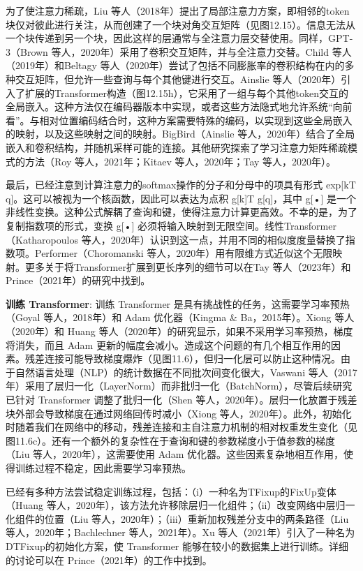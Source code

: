 \documentclass[lang=cn,newtx,10pt,scheme=chinese]{elegantbook}
\begin{document}
为了使注意力稀疏，Liu 等人（2018年）提出了局部注意力方案，即相邻的token块仅对彼此进行关注，从而创建了一个块对角交互矩阵（见图12.15）。信息无法从一个块传递到另一个块，因此这样的层通常与全注意力层交替使用。同样，GPT-3（Brown 等人，2020年）采用了卷积交互矩阵，并与全注意力交替。Child 等人（2019年）和Beltagy 等人（2020年）尝试了包括不同膨胀率的卷积结构在内的多种交互矩阵，但允许一些查询与每个其他键进行交互。Ainslie 等人（2020年）引入了扩展的Transformer构造（图12.15h），它采用了一组与每个其他token交互的全局嵌入。这种方法仅在编码器版本中实现，或者这些方法隐式地允许系统“向前看”。与相对位置编码结合时，这种方案需要特殊的编码，以实现到这些全局嵌入的映射，以及这些映射之间的映射。BigBird（Ainslie 等人，2020年）结合了全局嵌入和卷积结构，并随机采样可能的连接。其他研究探索了学习注意力矩阵稀疏模式的方法（Roy 等人，2021年；Kitaev 等人，2020年；Tay 等人，2020年）。

最后，已经注意到计算注意力的softmax操作的分子和分母中的项具有形式 exp[kT q]。这可以被视为一个核函数，因此可以表达为点积 g[k]T g[q]，其中 g[•] 是一个非线性变换。这种公式解耦了查询和键，使得注意力计算更高效。不幸的是，为了复制指数项的形式，变换 g[•] 必须将输入映射到无限空间。线性Transformer（Katharopoulos 等人，2020年）认识到这一点，并用不同的相似度度量替换了指数项。Performer（Choromanski 等人，2020年）用有限维方式近似这个无限映射。更多关于将Transformer扩展到更长序列的细节可以在Tay 等人（2023年）和Prince（2021年）的研究中找到。

\textbf{训练 Transformer}: 训练 Transformer 是具有挑战性的任务，这需要学习率预热（Goyal 等人，2018年）和 Adam 优化器（Kingma \& Ba，2015年）。Xiong 等人（2020年）和 Huang 等人（2020年）的研究显示，如果不采用学习率预热，梯度将消失，而且 Adam 更新的幅度会减小。造成这个问题的有几个相互作用的因素。残差连接可能导致梯度爆炸（见图11.6），但归一化层可以防止这种情况。由于自然语言处理（NLP）的统计数据在不同批次间变化很大，Vaswani 等人（2017年）采用了层归一化（LayerNorm）而非批归一化（BatchNorm），尽管后续研究已针对 Transformer 调整了批归一化（Shen 等人，2020年）。层归一化放置于残差块外部会导致梯度在通过网络回传时减小（Xiong 等人，2020年）。此外，初始化时随着我们在网络中的移动，残差连接和主自注意力机制的相对权重发生变化（见图11.6c）。还有一个额外的复杂性在于查询和键的参数梯度小于值参数的梯度（Liu 等人，2020年），这需要使用 Adam 优化器。这些因素复杂地相互作用，使得训练过程不稳定，因此需要学习率预热。

已经有多种方法尝试稳定训练过程，包括：（i）一种名为TFixup的FixUp变体（Huang 等人，2020年），该方法允许移除层归一化组件；（ii）改变网络中层归一化组件的位置（Liu 等人，2020年）；（iii）重新加权残差分支中的两条路径（Liu 等人，2020年；Bachlechner 等人，2021年）。Xu 等人（2021年）引入了一种名为DTFixup的初始化方案，使 Transformer 能够在较小的数据集上进行训练。详细的讨论可以在 Prince（2021年）的工作中找到。
\end{document}
